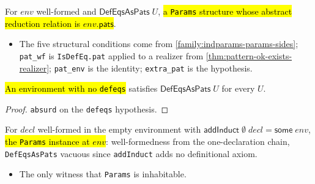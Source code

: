\begin{definition}
\label{def:indparams-toparams}
\leanok
{} 

 For $env$ well-formed and $\mathsf{DefEqsAsPats}\;U$, \hl{a \texttt{Params}
structure whose abstract reduction relation is $env.\mathsf{pats}$}.
\begin{itemize}
\item The five structural conditions come from \ref{family:indparams-params-sides};
\texttt{pat\_wf} is \texttt{IsDefEq.pat} applied to a realizer from
\ref{thm:pattern-ok-exists-realizer}; \texttt{pat\_env} is the identity; \texttt{extra\_pat}
is the hypothesis.
\end{itemize}
\end{definition}

\begin{lemma}
\label{thm:indparams-defeqs-as-pats-vacuous}
\leanok
{} 

 \hl{An environment with no \texttt{defeqs}} satisfies
$\mathsf{DefEqsAsPats}\;U$ for every $U$.
\end{lemma}
\begin{proof}
\leanok
{} \texttt{absurd} on the \texttt{defeqs} hypothesis.
\end{proof}

\begin{definition}
\label{def:indparams-induct-params}
\leanok
{} 

 For $decl$ well-formed in the empty environment with
$\mathsf{addInduct}\;\emptyset\;decl=\mathsf{some}\;env$, \hl{the \texttt{Params} instance at
$env$}: well-formedness from the one-declaration chain, \texttt{DefEqsAsPats} vacuous since
\texttt{addInduct} adds no definitional axiom.
\begin{itemize}
\item {} The only witness that \texttt{Params} is inhabitable.
\end{itemize}
\end{definition}

